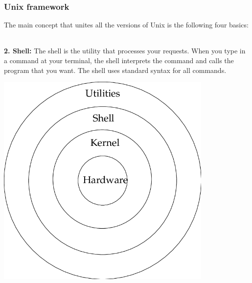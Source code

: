 \documentclass{if-beamer}
\begin{document}
\begin{frame}
\frametitle{Unix framework}
The main concept that unites all the versions of Unix is the following four basics: \\~\

\begin{minipage}{.45\textwidth}
	\textbf{2. Shell:} The shell is the utility that processes your requests. When you type in a command at your terminal, the shell interprets the command and calls the program that you want. The shell uses standard syntax for all commands.
\end{minipage} 
\begin{minipage}{.5\textwidth}
	
	\includegraphics[width=0.8\textwidth]{figures/unix.png}
\end{minipage} 
\end{frame}
\end{document}
